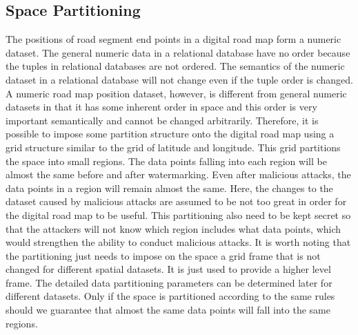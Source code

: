\subsection{Space Partitioning}
The positions of road segment end points in a digital road
map form a numeric dataset. The general numeric data
in a relational database have no order because the tuples
in relational databases are not ordered. The semantics of
the numeric dataset in a relational database will not change
even if the tuple order is changed. A numeric road map
position dataset, however, is different from general numeric
datasets in that it has some inherent order in space and this
order is very important semantically and cannot be changed
arbitrarily. Therefore, it is possible to impose some partition 
structure onto the digital road map using a grid structure 
similar to the grid of latitude and longitude. This grid
partitions the space into small regions. The data points
falling into each region will be almost the same before and
after watermarking. Even after malicious attacks, the data
points in a region will remain almost the same. Here, the
changes to the dataset caused by malicious attacks are assumed 
to be not too great in order for the digital road map to be useful. 
This partitioning also need to be kept secret so that the 
attackers will not know which region includes what data points,
which would strengthen the ability to conduct malicious attacks. 
It is worth noting that the partitioning just needs to impose 
on the space a grid frame that is not changed for different 
spatial datasets. It is just used to provide a higher level frame. 
The detailed data partitioning parameters can be determined later 
for different datasets. Only if the space is partitioned according 
to the same rules should we guarantee that almost the same data 
points will fall into the same regions.



